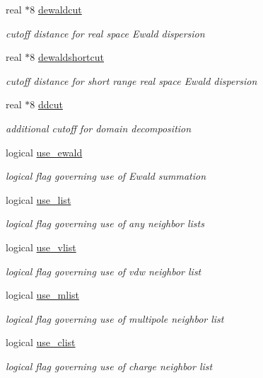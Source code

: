 \begin{DoxyCompactItemize}
real $\ast$8 \hyperlink{classcutoff_ab63d9aaa66f502a6018bf46e4581393a}{dewaldcut}
\begin{DoxyCompactList}\small\item\em cutoff distance for real space Ewald dispersion \end{DoxyCompactList}\item 
real $\ast$8 \hyperlink{classcutoff_ada4ff7525cda0e4f6d2dd37e31d5afbc}{dewaldshortcut}
\begin{DoxyCompactList}\small\item\em cutoff distance for short range real space Ewald dispersion \end{DoxyCompactList}\item 
real $\ast$8 \hyperlink{classcutoff_aa9e3ae613ef354550d4e154605757e63}{ddcut}
\begin{DoxyCompactList}\small\item\em additional cutoff for domain decomposition \end{DoxyCompactList}\item 
logical \hyperlink{classcutoff_a68e2445b2a53329020d82edaa66e6f8c}{use\-\_\-ewald}
\begin{DoxyCompactList}\small\item\em logical flag governing use of Ewald summation \end{DoxyCompactList}\item 
logical \hyperlink{classcutoff_a0c1a72d650799c1818c677874db443a8}{use\-\_\-list}
\begin{DoxyCompactList}\small\item\em logical flag governing use of any neighbor lists \end{DoxyCompactList}\item 
logical \hyperlink{classcutoff_a6e39a257df09552614d105bf3adfd0b2}{use\-\_\-vlist}
\begin{DoxyCompactList}\small\item\em logical flag governing use of vdw neighbor list \end{DoxyCompactList}\item 
logical \hyperlink{classcutoff_a78501eaa9effc92e56a52d0651abb70c}{use\-\_\-mlist}
\begin{DoxyCompactList}\small\item\em logical flag governing use of multipole neighbor list \end{DoxyCompactList}\item 
logical \hyperlink{classcutoff_a1a4728afeb2081464ffc6ec1d0b210e0}{use\-\_\-clist}
\begin{DoxyCompactList}\small\item\em logical flag governing use of charge neighbor list \end{DoxyCompactList}\item 

\end{DoxyCompactItemize}
